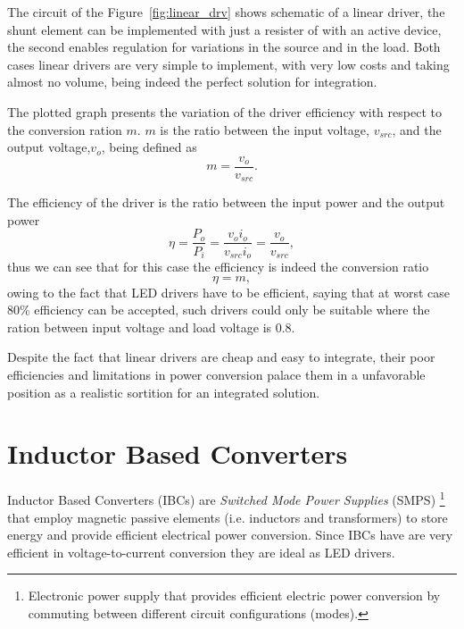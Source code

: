    The circuit of the Figure~\ref{fig:linear_drv} shows schematic of a linear driver, the shunt element can be implemented with just a resister of with an active device, the second enables regulation for variations in the source and in the load. Both cases linear drivers are very simple to implement, with very low costs and taking almost no volume, being indeed the perfect solution for integration.



   The plotted graph presents the variation of the driver efficiency with respect to the conversion ration $m$. $m$  is the ratio between the input voltage, $v_{src}$,  and the output voltage,$v_o$, being defined as
   \begin{equation}
        m = \frac{v_o}{v_{src}}.
   \end{equation}

   The efficiency of the driver is the ratio between the input power and the output power
   \begin{equation}
        \eta = \frac{P_o}{P_i} = \frac{v_o i_o}{v_{src} i_o} = \frac{v_o}{v_{src}},
   \end{equation}
   thus we can see that for this case the efficiency is indeed the conversion ratio
   \begin{equation}
        \eta = m,
   \end{equation}
   owing to the fact that LED drivers have to be efficient, saying that at worst case 80\% efficiency can be accepted, such drivers could only be suitable where the ration between input voltage and load voltage is 0.8.

   Despite the fact that linear drivers are cheap and easy to integrate, their poor efficiencies and limitations in power conversion palace them in a unfavorable position as a realistic sortition for an integrated solution.

\section{Inductor Based Converters}

Inductor Based Converters (IBCs) are \emph{Switched Mode Power Supplies} (SMPS) \footnote{Electronic power supply that provides efficient electric power conversion by commuting between different circuit configurations (modes).}  that employ magnetic passive elements (i.e. inductors and transformers) to store energy and provide efficient electrical power conversion. Since IBCs have are very efficient in voltage-to-current conversion they are ideal as LED drivers.

